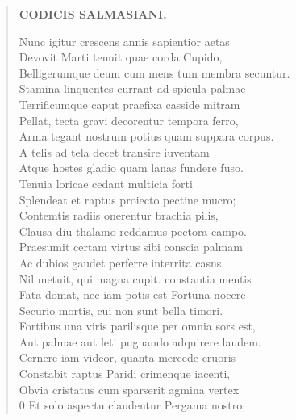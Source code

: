 \documentclass[11pt, a4paper]{report}
\begin{document}
\begin{verse}
    \begin{center} \textbf{CODICIS SALMASIANI.} \end{center} \marginpar{[163]} Nunc igitur crescens annis sapientior aetas \\ Devovit Marti tenuit quae corda Cupido, \\ Belligerumque deum cum mens tum membra secuntur. \\ Stamina linquentes currant ad spicula palmae \\ Terrificumque caput praefixa casside mitram \\ Pellat, tecta gravi decorentur tempora ferro, \\ Arma tegant nostrum potius quam suppara corpus. \\ A telis ad tela decet transire iuventam \\ Atque hostes gladio quam lanas fundere fuso. \\ Tenuia loricae cedant multicia forti \\ Splendeat et raptus proiecto pectine mucro; \\ Contemtis radiis onerentur brachia pilis, \\ Clausa diu thalamo reddamus pectora campo. \\ Praesumit certam virtus sibi conscia palmam \\ Ac dubios gaudet perferre interrita casns. \\ Nil metuit, qui magna cupit. constantia mentis \\ Fata domat, nec iam potis est Fortuna nocere \\ Securio mortis, cui non sunt bella timori. \\ Fortibus una viris parilisque per omnia sors est, \\ Aut palmae aut leti pugnando adquirere laudem. \\ Cernere iam videor, quanta mercede cruoris \\ Constabit raptus Paridi crimenque iacenti, \\ Obvia cristatus cum sparserit agmina vertex \\ 0 Et solo aspectu claudentur Pergama nostro; \\ 
      \end{verse}
  
\end{document}
